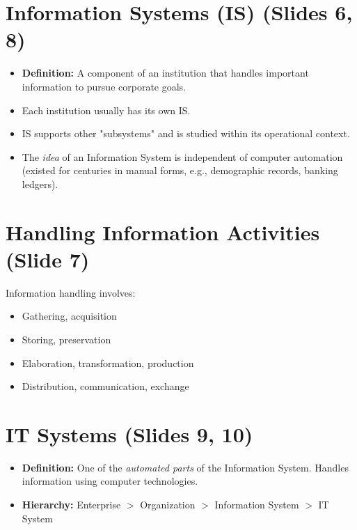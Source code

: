 \documentclass{article}
\begin{document}
	\section{Information Systems (IS) (Slides 6, 8)}
	\begin{itemize}
		\item \textbf{Definition:} A component of an institution that handles important information to pursue corporate goals.
		\item Each institution usually has its own IS.
		\item IS supports other "subsystems" and is studied within its operational context.
		\item The \emph{idea} of an Information System is independent of computer automation (existed for centuries in manual forms, e.g., demographic records, banking ledgers).
	\end{itemize}
	
	\section{Handling Information Activities (Slide 7)}
	Information handling involves:
	\begin{itemize}
		\item Gathering, acquisition
		\item Storing, preservation
		\item Elaboration, transformation, production
		\item Distribution, communication, exchange
	\end{itemize}
	
	\section{IT Systems (Slides 9, 10)}
	\begin{itemize}
		\item \textbf{Definition:} One of the \emph{automated parts} of the Information System. Handles information using computer technologies.
		\item \textbf{Hierarchy:} Enterprise $>$ Organization $>$ Information System $>$ IT System
	\end{itemize}
	
\end{document}
